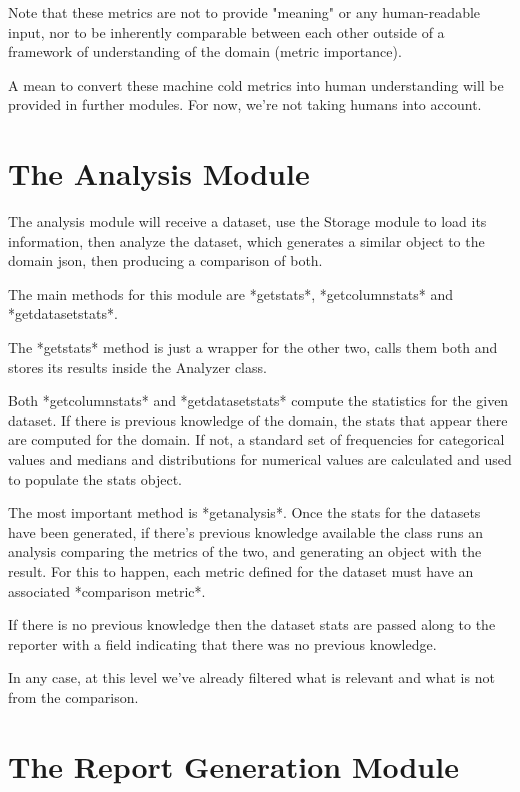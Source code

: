 Note that these metrics are not to provide "meaning" or any human-readable input, nor to be
inherently comparable between each other outside of a framework of understanding of the domain
(metric importance).

A mean to convert these machine cold metrics into human understanding will be provided in further 
modules. For now, we're not taking humans into account.

\section{The Analysis Module}
\label{cap2:sec:analysis}

The analysis module will receive a dataset, use the Storage module to load its information, then analyze the dataset, which generates a similar object to the domain json, then producing a comparison of both.

The main methods for this module are *getstats*, *getcolumnstats* and *getdatasetstats*.

The *getstats* method is just a wrapper for the other two, calls them both and stores its results inside the Analyzer class.

Both *getcolumnstats* and *getdatasetstats* compute the statistics for the given dataset. If there is previous knowledge of the domain, the stats that appear there are computed for the domain. If not, a standard set of frequencies for categorical values and medians and distributions for numerical values are calculated and used to populate the stats object.

The most important method is *getanalysis*. Once the stats for the datasets have been generated, if there's previous knowledge available the class runs an analysis comparing the metrics of the two, and generating an object with the result. For this to happen, each metric defined for the dataset must have an associated *comparison metric*.

If there is no previous knowledge then the dataset stats are passed along to the reporter with a field indicating that there was no previous knowledge.

In any case, at this level we've already filtered what is relevant and what is not from the comparison.

\section{The Report Generation Module}
\label{cap2:sec:reporter}


